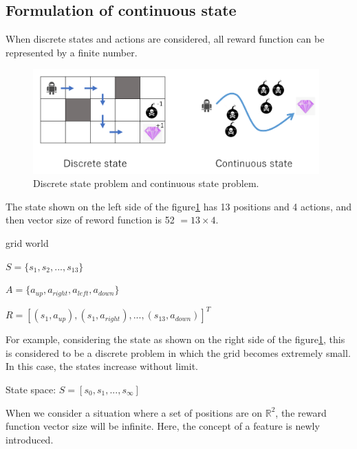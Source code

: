 \subsection{Formulation of continuous state}


When discrete states and actions are considered, all reward function can be represented by a finite number.


\begin{figure}[H]
\begin{center}
\includegraphics[width=11cm]{./figures/example_discrete_continuous.png}
\caption{Discrete state problem and continuous state problem.}
\label{fig:example_discrete_continuous}
\end{center}
\end{figure}


The state shown on the left side of the figure\ref{fig:example_discrete_continuous} has 13 positions and 4 actions, and then vector size of reword function is 52 $= 13 \times 4$.

\begin{itembox}[l]{grid world}

 \hspace{1cm} $S = \{ s_1, s_2, ... , s_{13} \}$

 \hspace{1.5cm} $A = \{ a_{up}, a_{right}, a_{left} , a_{down} \}$

 $R = [ (s_1, a_{up}), (s_1, a_{right}), ... ,(s_{13}, a_{down}) ]^T$
\end{itembox}

For example, considering the state as shown on the right side of the figure\ref{fig:example_discrete_continuous}, this is considered to be a discrete problem in which the grid becomes extremely small.
In this case, the states increase without limit.
\begin{center}
State space: $S = [ s_0, s_1, ... ,s_{\infty} ]$
\end{center}
When we consider a situation where a set of positions are on $\mathbb{R}^2$, the reward function vector size will be infinite.
Here, the concept of a feature is newly introduced.

